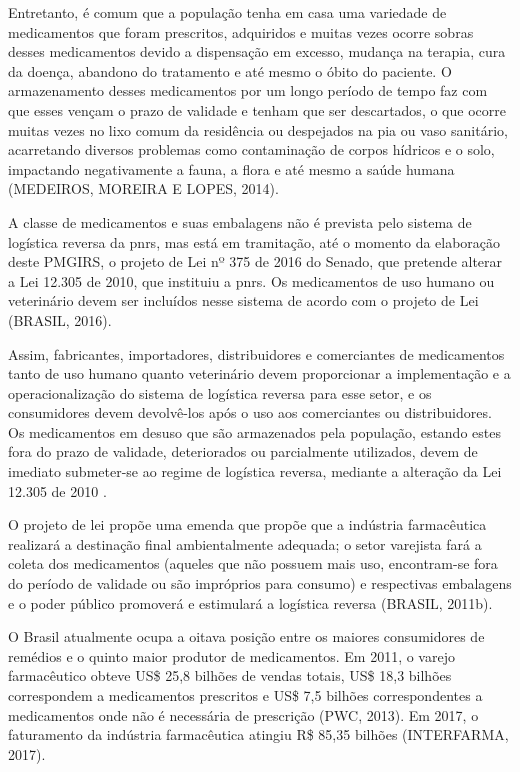 \begin{description}
	Entretanto, é comum que a população tenha em casa uma variedade de medicamentos que foram prescritos, adquiridos e muitas vezes ocorre sobras desses medicamentos devido a dispensação em excesso, mudança na terapia, cura da doença, abandono do tratamento e até mesmo o óbito do paciente. O armazenamento desses medicamentos por um longo período de tempo faz com que esses vençam o prazo de validade e tenham que ser descartados, o que ocorre muitas vezes no lixo comum da residência ou despejados na pia ou vaso sanitário, acarretando diversos problemas como contaminação de corpos hídricos e o solo, impactando negativamente a fauna, a flora e até mesmo a saúde humana (MEDEIROS, MOREIRA E LOPES, 2014).
	
	A classe de medicamentos e suas embalagens não é prevista pelo sistema de logística reversa da \gls{pnrs}, mas está em tramitação, até o momento da elaboração deste PMGIRS, o projeto de Lei nº 375 de 2016 do Senado, que pretende alterar a Lei 12.305 de 2010, que instituiu a \gls{pnrs}. Os medicamentos de uso humano ou veterinário devem ser incluídos nesse sistema de acordo com o projeto de Lei (BRASIL, 2016).
	
	Assim, fabricantes, importadores, distribuidores e comerciantes de medicamentos tanto de uso humano quanto veterinário devem proporcionar a implementação e a operacionalização do sistema de logística reversa para esse setor, e os consumidores devem devolvê-los após o uso aos comerciantes ou distribuidores. Os medicamentos em desuso que são armazenados pela população, estando estes fora do prazo de validade, deteriorados ou parcialmente utilizados, devem de imediato submeter-se ao regime de logística reversa, mediante a alteração da Lei 12.305 de 2010 \cite{brasil:12305}.
	
	O projeto de lei propõe uma emenda que propõe que a indústria farmacêutica realizará a destinação final ambientalmente adequada; o setor varejista fará a coleta dos medicamentos (aqueles que não possuem mais uso, encontram-se fora do período de validade ou são impróprios para consumo) e respectivas embalagens e o poder público promoverá e estimulará a logística reversa (BRASIL, 2011b).

	O Brasil atualmente ocupa a oitava posição entre os maiores consumidores de remédios e o quinto maior produtor de medicamentos. Em 2011, o varejo farmacêutico obteve US\$ 25,8 bilhões de vendas totais, US\$ 18,3 bilhões correspondem a medicamentos prescritos e US\$ 7,5 bilhões correspondentes a medicamentos onde não é necessária de prescrição (PWC, 2013). Em 2017, o faturamento da indústria farmacêutica atingiu R\$ 85,35 bilhões (INTERFARMA, 2017).
	 

\end{description}

